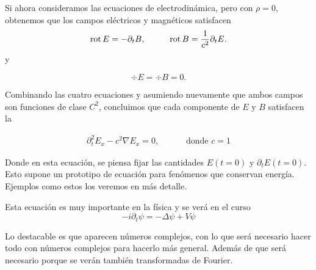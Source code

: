 
\begin{example}

Si ahora consideramos las ecuaciones de electrodinámica, pero con $\rho = 0$, obtenemos que los campos eléctricos y magnéticos satisfacen
\begin{eqnarray}
    \operatorname{rot} E = - \partial_t B, & \qquad & \operatorname{rot} B = \frac{1}{c^2} \partial_t E.
\end{eqnarray}
y

\begin{equation}
    \div E = \div B = 0.
\end{equation}

Combinando las cuatro ecuaciones y asumiendo nuevamente que ambos campos son funciones de clase $C^2$, concluimos que cada componente de $E$ y $B$ satisfacen la 




\begin{eqnarray}
    \partial_t^2 E_x - c^2 \nabla E_x = 0, &\qquad \mbox{ donde } c = 1
\end{eqnarray}

Donde en esta ecuación, se piensa fijar las cantidades $E(t=0)$ y $\partial_t E(t=0)$. Esto supone un prototipo de ecuación para fenómenos que conservan energía. Ejemplos como estos los veremos en más detalle.
\end{example}

\begin{example}
Esta ecuación es muy importante en la física y se verá en el curso
\begin{equation}
    -i\partial_t \psi = - \Delta\psi + V \psi
\end{equation}

Lo destacable es que aparecen números complejos, con lo que será necesario hacer todo con números complejos para hacerlo más general. Además de que será necesario porque se verán también transformadas de Fourier.
\end{example}


